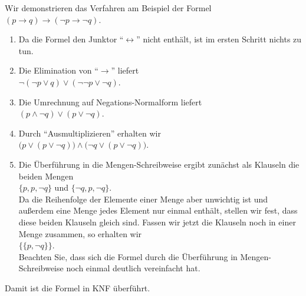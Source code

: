 Wir demonstrieren das Verfahren am Beispiel der Formel\\[0.2cm]
\hspace*{1.3cm} $(p \rightarrow q) \rightarrow (\neg p \rightarrow \neg q)$.
\begin{enumerate}
\item Da die Formel den Junktor ``$\leftrightarrow$'' nicht enthält,
      ist im ersten Schritt nichts zu tun.
\item Die Elimination von ``$\rightarrow$'' liefert \\[0.2cm]
      \hspace*{1.3cm} $\neg (\neg p \vee q) \vee (\neg \neg p \vee \neg q)$.
\item Die Umrechnung auf Negations-Normalform liefert \\[0.2cm]
      \hspace*{1.3cm} $(p \wedge \neg q) \vee (p \vee \neg q)$.
\item Durch ``Ausmultiplizieren'' erhalten wir \\[0.2cm]
      \hspace*{1.3cm} $\bigl(p \vee (p \vee \neg q)\bigr) \wedge \bigl(\neg q \vee (p \vee \neg q)\bigr)$.
\item Die Überführung in die Mengen-Schreibweise ergibt zunächst als Klauseln die beiden Mengen \\[0.2cm]
      \hspace*{1.3cm} $\{p, p, \neg q\}$ \quad und \quad $\{\neg q,  p,  \neg q\}$. \\[0.2cm]
      Da die Reihenfolge der Elemente einer Menge aber unwichtig ist und außerdem eine Menge
      jedes Element nur einmal enthält, stellen wir fest, dass diese beiden Klauseln gleich sind.
      Fassen wir jetzt die Klauseln noch in einer Menge zusammen, so erhalten wir \\[0.2cm]
      \hspace*{1.3cm} $\bigl\{ \{p, \neg q\} \bigr\}$. \\[0.2cm]
      Beachten Sie, dass sich die Formel durch die Überführung in 
      Mengen-Schreibweise noch einmal deutlich vereinfacht hat.
\end{enumerate}
Damit ist die Formel in KNF überführt.

